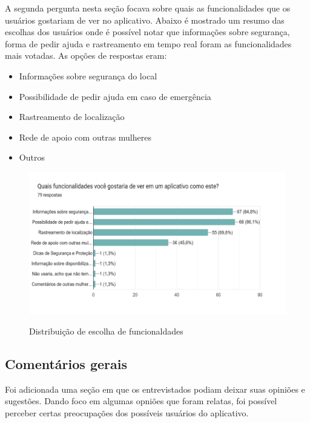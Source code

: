A segunda pergunta nesta seção focava sobre quais as funcionalidades que os usuários gostariam de ver no aplicativo. Abaixo é mostrado um resumo das escolhas dos usuários onde é possível notar que informações sobre segurança, forma de pedir ajuda e rastreamento em tempo real foram as funcionalidades mais votadas. As opções de respostas eram:
\begin{itemize}
  \item Informações sobre segurança do local
  \item Possibilidade de pedir ajuda em caso de emergência
  \item Rastreamento de localização
  \item Rede de apoio com outras mulheres
  \item Outros
\end{itemize}

\begin{figure}[h]
  \begin{center}
  \includegraphics[width=1.0\linewidth]{images/distribuicao-escolha-funcionalidades.png}\\
  \end{center}
  \caption[Distribuição de escolha de funcionalidades]{Distribuição de escolha de funcionaldades}
  \label{fig:distribuicao-escolha-funcionalidades}
\end{figure}

\subsection{Comentários gerais}
Foi adicionada uma seção em que os entrevistados podiam deixar suas opiniões e sugestões. Dando foco em algumas opniões que foram relatas, foi possível perceber certas preocupações dos possíveis usuários do aplicativo. 

